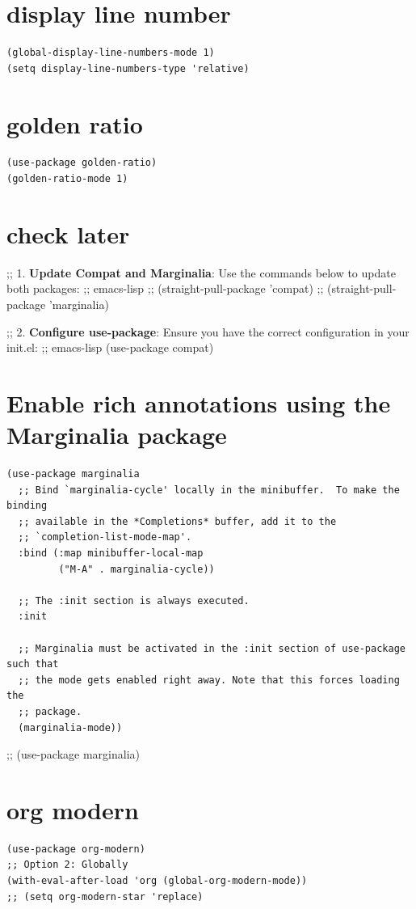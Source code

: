 \documentclass[11pt]{article}
\begin{document}
\section{display line number}
\label{sec:orgaadebc1}
\begin{verbatim}
(global-display-line-numbers-mode 1)
(setq display-line-numbers-type 'relative)
\end{verbatim}
\section{golden ratio}
\label{sec:org5e5c42d}
\begin{verbatim}
(use-package golden-ratio)
(golden-ratio-mode 1)
\end{verbatim}
\section{check later}
\label{sec:org72e921b}
;; 1. \textbf{Update Compat and Marginalia}: Use the commands below to update both packages:
;;    emacs-lisp
   ;; (straight-pull-package 'compat)
   ;; (straight-pull-package 'marginalia)


;; 2. \textbf{Configure use-package}: Ensure you have the correct configuration in your init.el:
;;    emacs-lisp
(use-package compat)
\section{Enable rich annotations using the Marginalia package}
\label{sec:orgf4a6d5e}
\begin{verbatim}
(use-package marginalia
  ;; Bind `marginalia-cycle' locally in the minibuffer.  To make the binding
  ;; available in the *Completions* buffer, add it to the
  ;; `completion-list-mode-map'.
  :bind (:map minibuffer-local-map
         ("M-A" . marginalia-cycle))

  ;; The :init section is always executed.
  :init

  ;; Marginalia must be activated in the :init section of use-package such that
  ;; the mode gets enabled right away. Note that this forces loading the
  ;; package.
  (marginalia-mode))
\end{verbatim}

;; (use-package marginalia)
\section{org modern}
\label{sec:orgc7fa9bc}
\begin{verbatim}
(use-package org-modern)
;; Option 2: Globally
(with-eval-after-load 'org (global-org-modern-mode))
;; (setq org-modern-star 'replace)
\end{verbatim}
\end{document}
